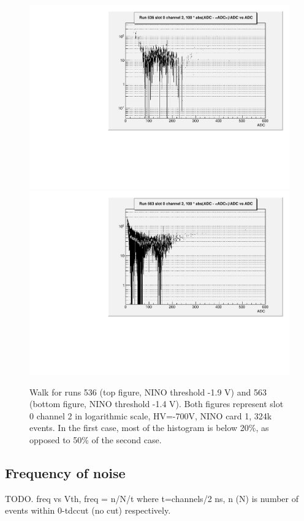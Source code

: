 \documentclass{article}
\begin{document}
\begin{figure}[htbp]
\includegraphics[width=\textwidth]{walk_NINO_1_9_PMT_700}
\includegraphics[width=\textwidth]{walk_NINO_1_4_PMT_700}
\caption{Walk for runs 536 (top figure, NINO threshold -1.9 V) and 563 (bottom figure, NINO threshold -1.4 V). 
Both figures represent slot 0 channel 2 in logarithmic scale, HV=-700V, NINO card 1, 324k events.
In the first case, most of the histogram is below 20\%, as opposed to 50\% of the second case.}
\label{fig:walk}
\end{figure}


\subsection{Frequency of noise}\label{sec:noise}
TODO.
freq vs Vth, freq = n/N/t where t=channels/2 ns, n (N) is number of events within 0-tdccut (no cut) respectively.
\end{document}
